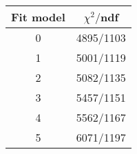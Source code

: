 \begin{tabular}{c|c}
Fit model & $\chi^2/$ndf \\
\hline
0 & 4895/1103\\
1 & 5001/1119\\
2 & 5082/1135\\
3 & 5457/1151\\
4 & 5562/1167\\
5 & 6071/1197\\
\end{tabular}
